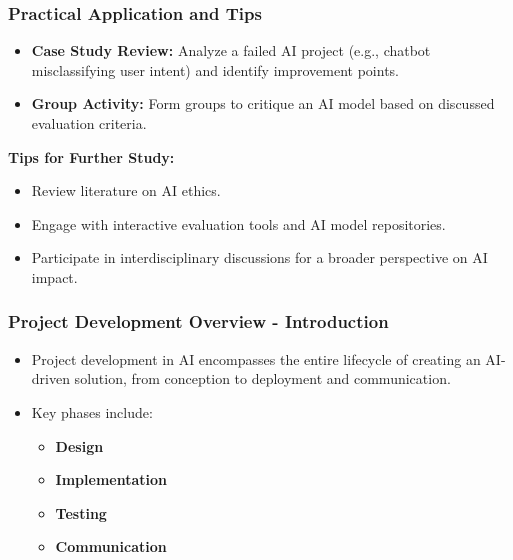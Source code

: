 \documentclass[aspectratio=169]{beamer}
\begin{document}
\begin{frame}[fragile]
    \frametitle{Practical Application and Tips}
    \begin{itemize}
        \item \textbf{Case Study Review:} Analyze a failed AI project (e.g., chatbot misclassifying user intent) and identify improvement points.
        \item \textbf{Group Activity:} Form groups to critique an AI model based on discussed evaluation criteria.
    \end{itemize}

    \textbf{Tips for Further Study:}
    \begin{itemize}
        \item Review literature on AI ethics.
        \item Engage with interactive evaluation tools and AI model repositories.
        \item Participate in interdisciplinary discussions for a broader perspective on AI impact.
    \end{itemize}
\end{frame}

\begin{frame}[fragile]
    \frametitle{Project Development Overview - Introduction}
    \begin{itemize}
        \item Project development in AI encompasses the entire lifecycle of creating an AI-driven solution, from conception to deployment and communication.
        \item Key phases include:
        \begin{itemize}
            \item \textbf{Design}
            \item \textbf{Implementation}
            \item \textbf{Testing}
            \item \textbf{Communication}
        \end{itemize}
    \end{itemize}
\end{frame}
\end{document}
